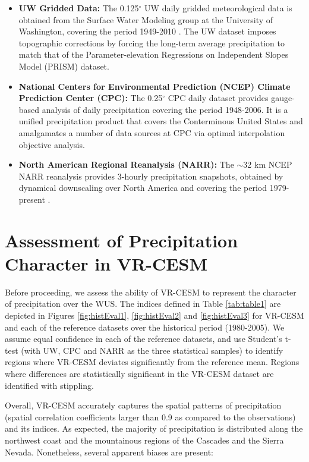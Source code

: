 \documentclass{ametsoc}
\begin{document}
\begin{itemize}
\item[] \textbf{UW Gridded Data:}  The 0.125$^\circ$ UW daily gridded meteorological data is obtained from the Surface Water Modeling group at the University of Washington, covering the period 1949-2010 \citep{maurer2002long, hamlet2005production}. The UW dataset imposes topographic corrections by forcing the long-term average precipitation to match that of the Parameter-elevation Regressions on Independent Slopes Model (PRISM) dataset.

\item[] \textbf{National Centers for Environmental Prediction (NCEP) Climate Prediction Center (CPC):}  The 0.25$^\circ$ CPC daily dataset provides gauge-based analysis of daily precipitation covering the period 1948-2006. It is a unified precipitation product that covers the Conterminous United States and amalgamates a number of data sources at CPC via optimal interpolation objective analysis.

\item[] \textbf{North American Regional Reanalysis (NARR):}  The $\sim$32 km NCEP NARR reanalysis provides 3-hourly precipitation snapshots, obtained by dynamical downscaling over North America and covering the period 1979-present \citep{mesinger2006north}.
\end{itemize}



\section{Assessment of Precipitation Character in VR-CESM} \label{sec:ModelAssessment}

Before proceeding, we assess the ability of VR-CESM to represent the character of precipitation over the WUS.  The indices defined in Table \ref{tab:table1} are depicted in Figures \ref{fig:histEval1}, \ref{fig:histEval2} and \ref{fig:histEval3} for VR-CESM and each of the reference datasets over the historical period (1980-2005).  We assume equal confidence in each of the reference datasets, and use Student's t-test (with UW, CPC and NARR as the three statistical samples) to identify regions where VR-CESM deviates significantly from the reference mean.  Regions where differences are statistically significant in the VR-CESM dataset are identified with stippling.


Overall, VR-CESM accurately captures the spatial patterns of precipitation (spatial correlation coefficients larger than 0.9 as compared to the observations) and its indices.  As expected, the majority of precipitation is distributed along the northwest coast and the mountainous regions of the Cascades and the Sierra Nevada.  Nonetheless, several apparent biases are present:
\end{document}
